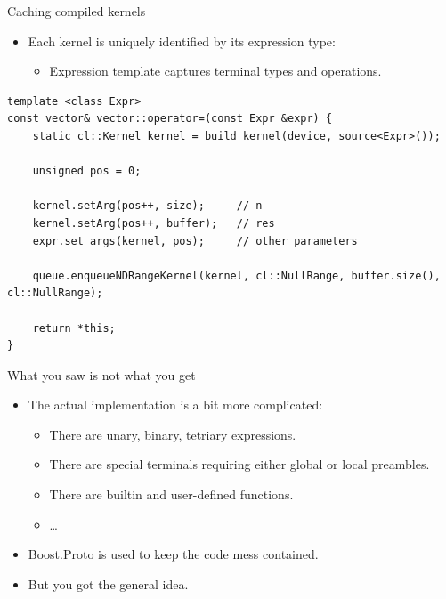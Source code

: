 \documentclass[@BEAMER_OPTIONS@]{beamer}
\begin{document}
\begin{frame}[fragile]{Caching compiled kernels}
    \begin{itemize}
        \item Each kernel is uniquely identified by its expression type:
            \begin{itemize}
                \item Expression template captures terminal types and
                    operations.
            \end{itemize}
    \end{itemize}
    \begin{exampleblock}{}
        \begin{lstlisting}
template <class Expr>
const vector& vector::operator=(const Expr &expr) {
    static cl::Kernel kernel = build_kernel(device, source<Expr>());

    unsigned pos = 0;

    kernel.setArg(pos++, size);     // n
    kernel.setArg(pos++, buffer);   // res
    expr.set_args(kernel, pos);     // other parameters

    queue.enqueueNDRangeKernel(kernel, cl::NullRange, buffer.size(), cl::NullRange);

    return *this;
}
        \end{lstlisting}
    \end{exampleblock}
\end{frame}

\note{ }

\begin{frame}[fragile]{What you saw is not what you get}
    \begin{itemize}
        \item The actual implementation is a bit more complicated:
            \begin{itemize}
                \item There are unary, binary, tetriary expressions.
                \item There are special terminals requiring either global or
                    local preambles.
                \item There are builtin and user-defined functions.
                \item \ldots
            \end{itemize}
        \item Boost.Proto is used to keep the code mess contained.
            \vspace{\baselineskip}
        \item But you got the general idea.
    \end{itemize}
\end{frame}
\end{document}

